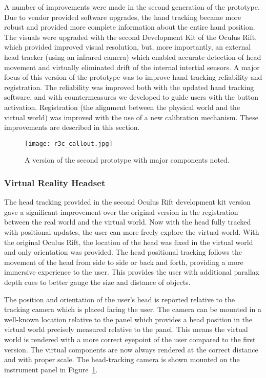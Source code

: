 A number of improvements were made in the second generation of the prototype.
Due to vendor provided software upgrades, the hand tracking became more robust and provided more complete information about the entire hand position.
The visuals were upgraded with the second Development Kit of the Oculus Rift, which provided improved visual resolution, but, more importantly, an external head tracker (using an infrared camera) which enabled accurate detection of head movement and virtually eliminated drift of the internal intertial sensors.
A major focus of this version of the prototype was to improve hand tracking reliability and registration.
The reliability was improved both with the updated hand tracking software, and with countermeasures we developed to guide users with the button activation.
Registration (the alignment between the physical world and the virtual world) was improved with the use of a new calibration mechanism.
These improvements are described in this section.

\begin{figure}
    \centering
    \texttt{[image: r3c\_callout.jpg]}
    \caption{A version of the second prototype with major components noted.}
    \label{fig:r3c_callout}
\end{figure}

\subsubsection{Virtual Reality Headset}

The head tracking provided in the second Oculus Rift development kit version gave a significant improvement over the original version in the registration between the real world and the virtual world.
Now with the head fully tracked with positional updates, the user can more freely explore the virtual world.
With the original Oculus Rift, the location of the head was fixed in the virtual world and only orientation was provided.
The head positional tracking follows the movement of the head from side to side or back and forth, providing a more immersive experience to the user.
This provides the user with additional parallax depth cues to better gauge the size and distance of objects.

The position and orientation of the user's head is reported relative to the tracking camera which is placed facing the user.
The camera can be mounted in a well-known location relative to the panel which provides a head position in the virtual world precisely measured relative to the panel.
This means the virtual world is rendered with a more correct eyepoint of the user compared to the first version.
The virtual components are now always rendered at the correct distance and with proper scale.
The head-tracking camera is shown mounted on the instrument panel in Figure~\ref{fig:r3c_callout}.


